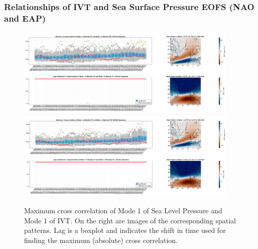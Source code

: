 \subsubsection{Relationships of IVT and Sea Surface Pressure EOFS (NAO and EAP)}

\begin{figure}
  \begin{center}
    \includegraphics[width=0.95\textwidth]{figures/crosscorrelation_boxplot_ivt_psl_modes11_ssp126_50seasons.png}
    \includegraphics[width=0.95\textwidth]{figures/crosscorrelation_boxplot_ivt_psl_modes11_ssp585_50seasons.png}
  \end{center}
  \caption{Maximum cross correlation of Mode 1 of Sea Level Pressure and Mode 1 of IVT. On the right are images of the corresponding spatial patterns. Lag is a boxplot and indicates the shift in time used for finding the maximum (absolute) cross correlation.}
  \label{fig:crosscor ivt psl modes11}
\end{figure}

